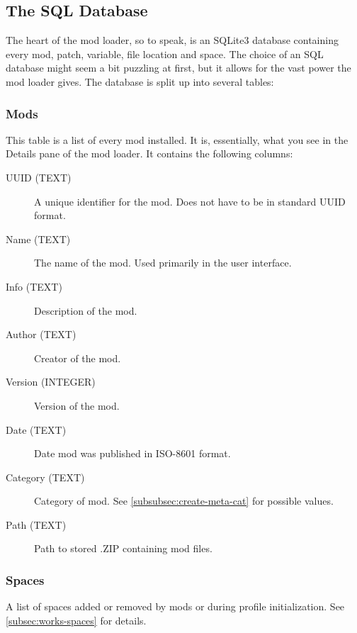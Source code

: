 
\subsection{The SQL Database}
The heart of the mod loader, so to speak, is an SQLite3 database containing every mod, patch, variable, file location and space. The choice of an SQL database might seem a bit puzzling at first, but it allows for the vast power the mod loader gives. The database is split up into several tables:

\subsubsection{Mods}
This table is a list of every mod installed. It is, essentially, what you see in the Details pane of the mod loader. It contains the following columns:

\begin{description}
\item[UUID (TEXT)] A unique identifier for the mod. Does not have to be in standard UUID format.
\item[Name (TEXT)] The name of the mod. Used primarily in the user interface.
\item[Info (TEXT)] Description of the mod.	
\item[Author (TEXT)] Creator of the mod.	
\item[Version (INTEGER)] Version of the mod.
\item[Date (TEXT)] Date mod was published in ISO-8601 format.
\item[Category (TEXT)] Category of mod. See \ref{subsubsec:create-meta-cat} for possible values.
\item[Path (TEXT)] Path to stored .ZIP containing mod files.
\end{description}

\subsubsection{Spaces}
A list of spaces added or removed by mods or during profile initialization. See \ref{subsec:works-spaces} for details.

